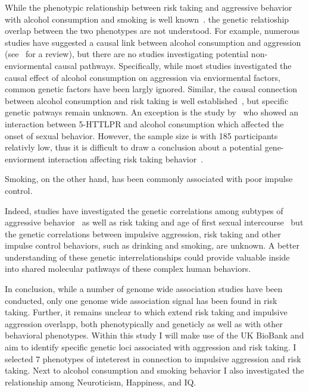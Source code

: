 While the phenotypic relationship between risk taking and aggressive behavior with alcohol consumption and smoking is well known~\cite{FRANZKOWIAX1987,Zuckerman2000,Dakwar2011}.
the genetic relatioship overlap between the two phenotypes are not understood.
For example, numerous studies have suggested a causal link between alcohol consumption and aggression (see~\citet{Bushman1990} for a review), but there are no studies investigating potential non-enviormental causal pathways.
Specifically, while most studies investigated the causal effect of alcohol consumption on aggression via enviormental factors, common genetic factors have been largly ignored.
Similar, the causal connection between alcohol consumption and risk taking is well established~\cite{Lane2004}, but specific genetic patways remain unknown.
An exception is the study by~\cite{Kogan2010} who showed an interaction between 5-HTTLPR and alcohol consumption which affected the onset of sexual behavior. 
However, the sample size is with 185 participants relativly low, thus it is difficult to draw a conclusion about a potential gene-enviorment interaction affecting risk taking behavior~\cite{Rubens2016}.

Smoking, on the other hand, has been commonly associated with poor impulse control.



Indeed, studies have investigated the genetic correlations among subtypes of aggressive behavior~\cite{Tuvblad2011a} as well as risk taking and age of first sexual intercourse~\cite{Day2016} but the genetic correlations between impulsive aggression, risk taking and other impulse control behaviors, such as drinking and smoking, are unknown.
A better understanding of these genetic interrelationships could provide valuable inside into shared molecular pathways of these complex human behaviors.

In conclusion, while a number of genome wide association studies have been conducted, only one genome wide association signal has been found in risk taking.
Further, it remains unclear to which extend risk taking and impulsive aggression overlapp, both phenotypically and geneticly as well as with other behavioral phenotypes.
Within this study I will make use of the UK BioBank and aim to identify specific genetic loci associated with aggression and risk taking.
I selected 7 phenotypes of inteterest in connection to impulsive aggression and risk taking.
Next to alcohol consumption and smoking behavior I also investigated the relationship among Neuroticism, Happiness, and IQ.
